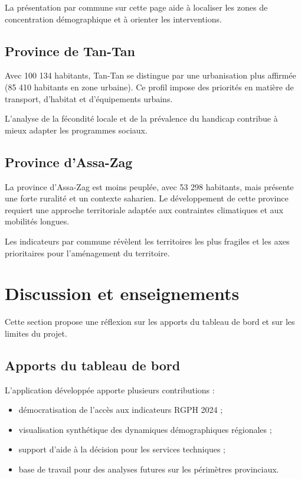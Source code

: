 \documentclass[12pt,a4paper,oneside]{report}
\begin{document}
La présentation par commune sur cette page aide à localiser les zones de concentration démographique et à orienter les interventions.

\section{Province de Tan-Tan}

Avec 100 134 habitants, Tan-Tan se distingue par une urbanisation plus affirmée (85 410 habitants en zone urbaine). Ce profil impose des priorités en matière de transport, d'habitat et d'équipements urbains.

L'analyse de la fécondité locale et de la prévalence du handicap contribue à mieux adapter les programmes sociaux.

\section{Province d'Assa-Zag}

La province d'Assa-Zag est moins peuplée, avec 53 298 habitants, mais présente une forte ruralité et un contexte saharien. Le développement de cette province requiert une approche territoriale adaptée aux contraintes climatiques et aux mobilités longues.

Les indicateurs par commune révèlent les territoires les plus fragiles et les axes prioritaires pour l'aménagement du territoire.

\chapter{Discussion et enseignements}

Cette section propose une réflexion sur les apports du tableau de bord et sur les limites du projet.

\section{Apports du tableau de bord}

L'application développée apporte plusieurs contributions :

\begin{itemize}[leftmargin=*]
  \item démocratisation de l'accès aux indicateurs RGPH 2024 ;
  \item visualisation synthétique des dynamiques démographiques régionales ;
  \item support d'aide à la décision pour les services techniques ;
  \item base de travail pour des analyses futures sur les périmètres provinciaux.
\end{itemize}
\end{document}
